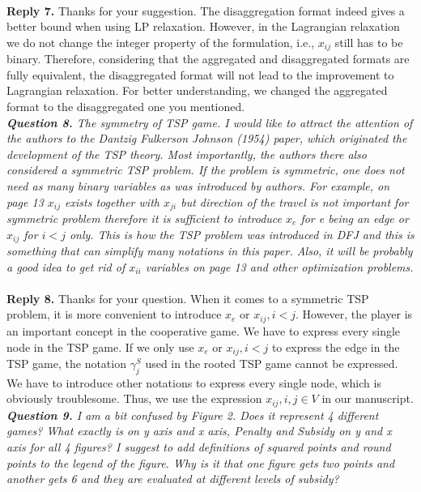 \documentclass[11pt]{article}
\begin{document}
\\[2mm]
\noindent \textbf{Reply 7.}
Thanks for your suggestion.
The disaggregation format indeed gives a better bound when using LP relaxation.
However, in the Lagrangian relaxation we do not change the integer property of the formulation, i.e., $x_{ij}$ still has to be binary. Therefore, considering that the aggregated and disaggregated formats are fully equivalent, the disaggregated format will not lead to the improvement to Lagrangian relaxation.
For better understanding, we changed the aggregated format to the disaggregated one you mentioned.
\\[4mm]
\noindent \textit{\textbf{Question 8.}
The symmetry of TSP game. I would like to attract the attention of the authors to the Dantzig Fulkerson Johnson (1954) paper, which originated the development of the TSP theory. Most importantly, the authors there also considered a symmetric TSP problem. If the problem is symmetric, one does not need as many binary variables as was introduced by authors. For example, on page 13 $x_{ij}$ exists together with $x_{ji}$ but direction of the travel is not important for symmetric problem therefore it is sufficient to introduce $x_e$ for e being an edge or $x_{ij}$ for $i < j$ only. This is how the TSP problem was introduced in DFJ and this is something that can simplify many notations in this paper. Also, it will be probably a good idea to get rid of $x_{ii}$ variables on page 13 and other optimization problems.}
~\\[2mm]
\noindent \textbf{Reply 8.}
Thanks for your question.
When it comes to a symmetric TSP problem, it is more convenient to introduce $x_e$ or $x_{ij}, i<j$.
However, the player is an important concept in the cooperative game.
We have to express every single node in the TSP game.
If we only use $x_e$ or $x_{ij}, i<j$ to express the edge in the TSP game, the notation $\gamma^{S}_j$ used in the rooted TSP game cannot be expressed. We have to introduce other notations to express every single node, which is obviously troublesome.
Thus, we use the expression $x_{ij}, i,j \in V$ in our manuscript.
\\[4mm]
\noindent \textit{\textbf{Question 9.}
I am a bit confused by Figure 2. Does it represent 4 different games? What exactly is on y axis and x axis, Penalty and Subsidy on y and x axis for all 4 figures? I suggest to add definitions of squared points and round points to the legend of the figure. Why is it that one figure gets two points and another gets 6 and they are evaluated at different levels of subsidy?}
\end{document}
